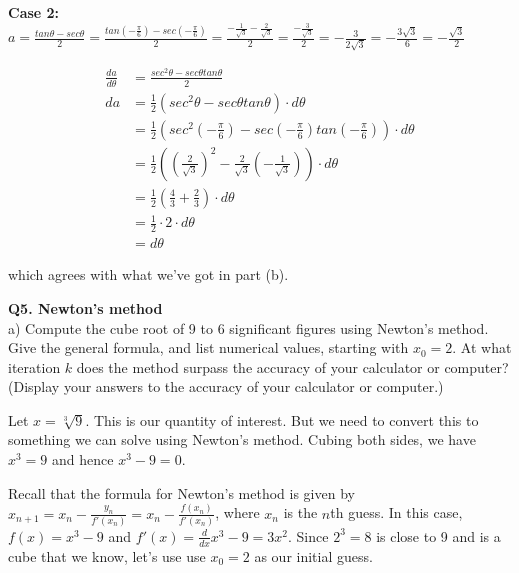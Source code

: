 \documentclass[9pt]{article}
\begin{document}
\textbf{Case 2:} $a = \frac{tan \theta - sec \theta}{2} = \frac{tan (-\frac{\pi}{6}) - sec (-\frac{\pi}{6})}{2} = \frac{-\frac{1}{\sqrt{3}} - \frac{2}{\sqrt{3}}}{2} = \frac{-\frac{3}{\sqrt{3}}}{2} = -\frac{3}{2 \sqrt{3}} = -\frac{3 \sqrt{3}}{6} = -\frac{\sqrt{3}}{2}$

\begin{align*}
  \frac{da}{d \theta} &= \frac{sec^2 \theta - sec \theta tan \theta}{2} \\
  da &= \frac{1}{2} (sec^2 \theta - sec \theta tan \theta) \cdot d \theta \\
     &= \frac{1}{2} (sec^2 (-\frac{\pi}{6}) - sec(-\frac{\pi}{6}) tan(-\frac{\pi}{6})) \cdot d \theta \\
     &= \frac{1}{2} ((\frac{2}{\sqrt{3}})^2 - \frac{2}{\sqrt{3}}(-\frac{1}{\sqrt{3}})) \cdot d \theta \\
     &= \frac{1}{2} (\frac{4}{3} + \frac{2}{3}) \cdot d \theta \\
     &= \frac{1}{2} \cdot 2 \cdot d \theta \\
     &= d \theta
\end{align*}

which agrees with what we've got in part (b).

\begin{tcolorbox}
  \textbf{Q5. Newton's method} \\
  a) Compute the cube root of 9 to 6 significant figures using Newton's method. Give the general formula, and list numerical values, starting with $x_0 = 2$. At what iteration $k$ does the method surpass the accuracy of your calculator or computer? (Display your answers to the accuracy of your calculator or computer.)
\end{tcolorbox}

Let $x = \sqrt[3]{9}$. This is our quantity of interest. But we need to convert this to something we can solve using Newton's method. Cubing both sides, we have $x^3 = 9$ and hence $x^3 - 9 = 0$.

Recall that the formula for Newton's method is given by $x_{n+1} = x_n - \frac{y_n}{f'(x_n)} = x_n - \frac{f(x_n)}{f'(x_n)}$, where $x_n$ is the $n$th guess. In this case, $f(x) = x^3 - 9$ and $f'(x) = \frac{d}{dx} x^3 - 9 = 3x^2$. Since $2^3 = 8$ is close to 9 and is a cube that we know, let's use use $x_0 = 2$ as our initial guess.
\end{document}
